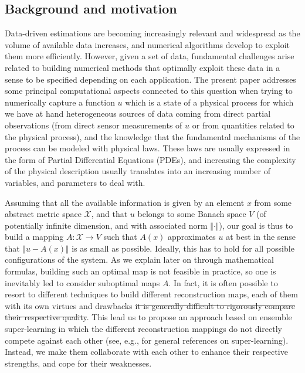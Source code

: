 \documentclass[11pt,a4paper,twoside]{article}
\newcommand{\asmodif}[2]{{\color{teal} #1} {\sout{#2}}}
\theoremstyle{definition}
\numberwithin{equation}{section}
\newcommand{\cX}{\ensuremath{\mathcal{X}}}
\newcommand{\<}{\langle}
\renewcommand{\>}{\rangle}
\begin{document}
\subsection{Background and motivation}
Data-driven estimations are becoming increasingly relevant and widespread as the volume of available data increases, and numerical algorithms develop to exploit them more efficiently. However, given a set of data, fundamental challenges arise related to building numerical methods that optimally exploit these data in a sense to be specified depending on each application. The present paper addresses some principal computational aspects connected to this question when trying to numerically capture a function $u$ which is a state of a physical process for which we have at hand heterogeneous sources of data coming from direct partial observations (from direct sensor measurements of $u$ or from quantities related to the physical process), and the knowledge that the fundamental mechanisms of the process can be modeled with physical laws. These laws are usually expressed in the form of Partial Differential Equations (PDEs), and increasing the complexity of the physical description usually translates into an increasing number of variables, and parameters to deal with.

Assuming that all the available information is given by an element $x$ from some abstract metric space $\cX$, and that $u$ belongs to some Banach space $V$ (of potentially infinite dimension, and with associated norm $\Vert\cdot\Vert$), our goal is thus to build a mapping $A:\cX\to V$ such that $A(x)$ approximates $u$ at best in the sense that $\Vert u - A(x)\Vert$ is as small as possible. Ideally, this has to hold for all possible configurations of the system. As we explain later on through mathematical formulas, building such an optimal map is not feasible in practice, so one is inevitably led to consider suboptimal maps $A$. In fact, it is often possible to resort to different techniques to build different reconstruction maps, \asmodif{each of them with its own virtues and drawbacks}{it is generally difficult to rigorously compare their respective quality}. This lead us to propose an approach based on ensemble super-learning in which the different reconstruction mappings do not directly compete against each other (see, e.g., \cite{Breiman1996, LPH2007, PL2010} for general references on super-learning). Instead, we make them collaborate with each other to enhance their respective strengths, and cope for their weaknesses.
\end{document}
